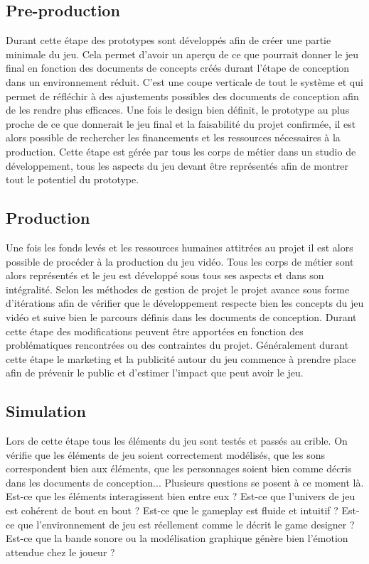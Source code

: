 \subsection{Pre-production}
Durant cette étape des prototypes sont développés afin de créer une partie minimale du jeu. Cela permet d'avoir un aperçu de ce que pourrait donner le jeu final en fonction des documents de concepts créés durant l'étape de conception dans un environnement réduit. C'est une coupe verticale de tout le système et qui permet de réfléchir à des ajustements possibles des documents de conception afin de les rendre plus efficaces. Une fois le design bien définit, le prototype au plus proche de ce que donnerait le jeu final et la faisabilité du projet confirmée, il est alors possible de rechercher les financements et les ressources nécessaires à la production. Cette étape est gérée par tous les corps de métier dans un studio de développement, tous les aspects du jeu devant être représentés afin de montrer tout le potentiel du prototype.

\subsection{Production}
Une fois les fonds levés et les ressources humaines attitrées au projet il est alors possible de procéder à la production du jeu vidéo. Tous les corps de métier sont alors représentés et le jeu est développé sous tous ses aspects et dans son intégralité. Selon les méthodes de gestion de projet le projet avance sous forme d'itérations afin de vérifier que le développement respecte bien les concepts du jeu vidéo et suive bien le parcours définis dans les documents de conception. Durant cette étape des modifications peuvent être apportées en fonction des problématiques rencontrées ou des contraintes du projet. Généralement durant cette étape le marketing et la publicité autour du jeu commence à prendre place afin de prévenir le public et d'estimer l'impact que peut avoir le jeu.

\subsection{Simulation}
Lors de cette étape tous les éléments du jeu sont testés et passés au crible. On vérifie que les éléments de jeu soient correctement modélisés, que les sons correspondent bien aux éléments, que les personnages soient bien comme décris dans les documents de conception... Plusieurs questions se posent à ce moment là. Est-ce que les éléments interagissent bien entre eux ? Est-ce que l'univers de jeu est cohérent de bout en bout ? Est-ce que le gameplay est fluide et intuitif ? Est-ce que l'environnement de jeu est réellement comme le décrit le game designer ? Est-ce que la bande sonore ou la modélisation graphique génère bien l'émotion attendue chez le joueur ?

